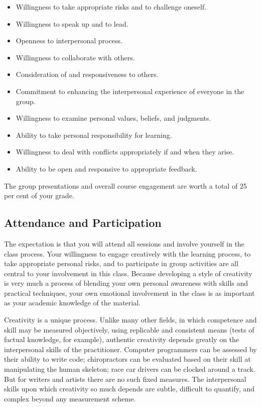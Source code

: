 \documentclass[letterpaper,10pt,headsepline]{scrreprt}
\begin{document}
\begin{itemize}
\item Willingness to take appropriate risks and to challenge oneself.
\item Willingness to speak up and to lead.
\item Openness to interpersonal process.
\item Willingness to collaborate with others.
\item Consideration of and responsiveness to others.
\item Commitment to enhancing the interpersonal experience of everyone in the group.
\item Willingness to examine personal values, beliefs, and judgments.
\item Ability to take personal responsibility for learning.
\item Willingness to deal with conflicts appropriately if and when they arise.
\item Ability to be open and responsive to appropriate feedback.
 
\end{itemize}


The group presentations and overall course engagement are worth a total of 25 per cent of your grade.

\subsection{Attendance and Participation}
The expectation is that you will attend all sessions and involve yourself in the class process. Your willingness to engage creatively with the learning process, to take appropriate personal risks, and to participate in group activities are all central to your involvement in this class. Because developing a style of creativity is very much a process of blending your own personal awareness with skills and practical techniques, your own emotional involvement in the class is as important as your academic knowledge of the material.

Creativity is a unique process. Unlike many other fields, in which competence and skill may be measured objectively, using replicable and consistent means (tests of factual knowledge, for example), authentic creativity depends greatly on the interpersonal skills of the practitioner. Computer programmers can be assessed by their ability to write code; chiropractors can be evaluated based on their skill at manipulating the human skeleton; race car drivers can be clocked around a track. But for writers and artists there are no such fixed measures. The interpersonal skills upon which creativity so much depends are subtle, difficult to quantify, and complex beyond any measurement scheme.
\end{document}
